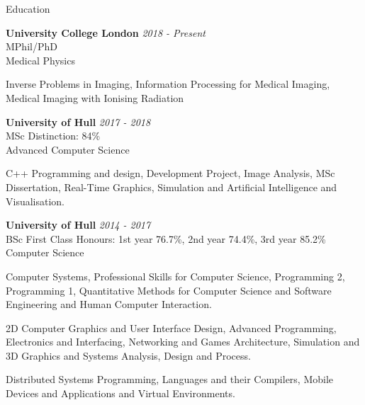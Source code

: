 \documentclass{cv} %
\begin{document}
\begin{rSection}{Education}

{\bf University College London} \hfill {\em 2018 - Present} 
\\ MPhil/PhD
\\ Medical Physics

\item Inverse Problems in Imaging, Information Processing for Medical Imaging, Medical Imaging with Ionising Radiation

{\bf University of Hull} \hfill {\em 2017 - 2018} 
\\ MSc \hfill {Distinction: 84\%}
\\ Advanced Computer Science

\item C++ Programming and design, Development Project, Image Analysis, MSc Dissertation, Real-Time Graphics, Simulation and Artificial Intelligence and Visualisation.

{\bf University of Hull} \hfill {\em 2014 - 2017} 
\\ BSc \hfill {First Class Honours: 1st year 76.7\%, 2nd year 74.4\%, 3rd year 85.2\%}
\\ Computer Science

\item Computer Systems, Professional Skills for Computer Science, Programming 2, Programming 1, Quantitative Methods for Computer Science and Software Engineering and Human Computer Interaction.

\item 2D Computer Graphics and User Interface Design, Advanced Programming, Electronics and Interfacing, Networking and Games Architecture, Simulation and 3D Graphics and Systems Analysis, Design and Process.

\item Distributed Systems Programming, Languages and their Compilers, Mobile Devices and Applications and Virtual Environments.

\end{rSection}

\end{document}
